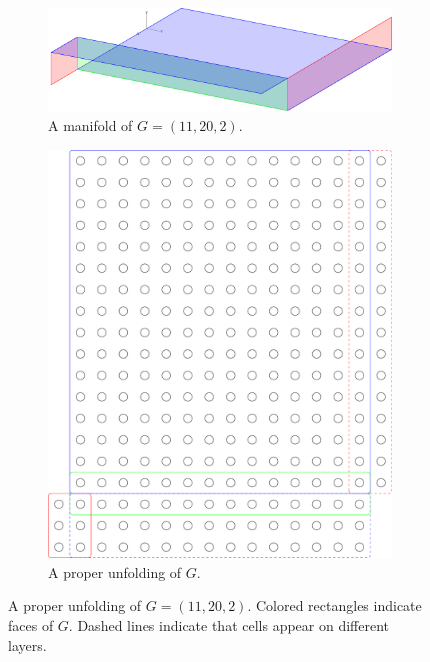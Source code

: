 \begin{figure}[]
\centering
\begin{subfigure}{0.45\textwidth}
	\includegraphics[width=\textwidth]{figures/7/11x20x2_manifold_3d.pdf}
	\caption{A manifold of $G= (11,20,2)$.}
	\label{}
\end{subfigure} \hfill%
\begin{subfigure}{0.45\textwidth}
	\includegraphics[width=\textwidth]{figures/7/11x20x2_manifold.pdf}
	\caption{A proper unfolding of $G$.}
	\label{}
\end{subfigure}
\caption{A proper unfolding of $G= (11,20,2)$. Colored rectangles indicate faces of $G$. Dashed lines indicate that cells appear on different layers. }
\label{fig:11x20x2_manifold}
\end{figure} 

